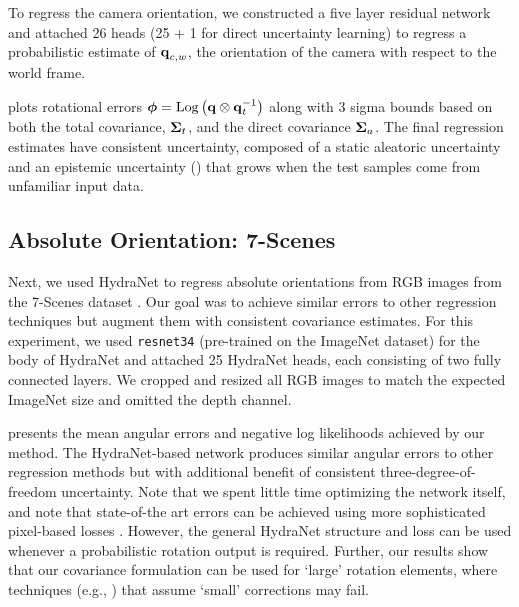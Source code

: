 To regress the camera orientation, we constructed a five layer residual network and attached 26 heads (25 + 1 for direct uncertainty learning) to regress a probabilistic estimate of $\boldsymbol{\mathbf{q}}_{c,w}$, the orientation of the camera with respect to the world frame.

 plots rotational errors $\boldsymbol{\mathbf{\phi}} = \mathrm{Log}\left({\boldsymbol{\mathbf{q}} \otimes \boldsymbol{\mathbf{q}}_t^{-1}}\right)$  along with 3 sigma bounds based on both the total covariance, $\boldsymbol{\mathbf{\Sigma}}_t$, and the direct covariance $\boldsymbol{\mathbf{\Sigma}}_a$. The final regression estimates have consistent uncertainty, composed of a static aleatoric uncertainty  and an epistemic uncertainty () that grows when the test samples come from unfamiliar input data.

\subsection{Absolute Orientation: 7-Scenes}
Next, we used HydraNet to regress absolute orientations from RGB images from the 7-Scenes dataset \citep{Glocker7scenes}. Our goal was to achieve similar errors to other regression techniques \citep{Kendall2017-ud} but augment them with consistent covariance estimates. For this experiment, we used \texttt{resnet34} \citep{he2016deep} (pre-trained on the ImageNet dataset) for the body of HydraNet and attached 25 HydraNet heads, each consisting of two fully connected layers. We cropped and resized all RGB images to match the expected ImageNet size and omitted the depth channel.

 presents the mean angular errors and negative log likelihoods achieved by our method. The HydraNet-based network produces similar angular errors to other regression methods \citep{Kendall2017-ud} but with additional benefit of consistent three-degree-of-freedom uncertainty. Note that we spent little time optimizing the network itself, and note that state-of-the art errors can be achieved using more sophisticated pixel-based losses \citep{Brachmann2018-us}. However, the general HydraNet structure and loss can be used whenever a probabilistic rotation output is required. Further, our results show that our covariance formulation can be used for `large' rotation elements, where techniques (e.g., \citep{2018_Peretroukhin_Deep}) that assume `small' corrections may fail.

